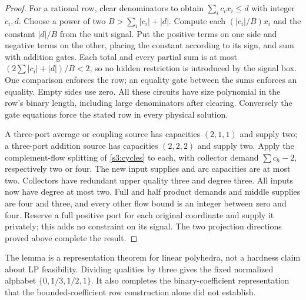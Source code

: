 \begin{proof}
For a rational row, clear denominators to obtain
$\sum_i c_ix_i\le d$ with integer $c_i,d$. Choose a power of two
$B>\sum_i|c_i|+|d|$. Compute each $(|c_i|/B)x_i$ and the constant
$|d|/B$ from the unit signal. Put the positive terms on one side and
negative terms on the other, placing the constant according to its sign,
and sum with addition gates. Each total and every partial sum is at
most $(2\sum|c_i|+|d|)/B<2$, so no hidden restriction is introduced
by the signal box. One comparison enforces the row; an equality gate
between the sums enforces an equality. Empty sides use zero. All these
circuits have size polynomial in the row's binary length, including
large denominators after clearing. Conversely the gate equations force
the stated row in every physical solution.

A three-port average or coupling source has capacities $(2,1,1)$ and
supply two; a three-port addition source has capacities $(2,2,2)$ and
supply two. Apply the complement-flow splitting of \cref{s3:cycles}
to each, with collector demand $\sum c_h-2$, respectively two or four.
The new input supplies and arc capacities are at most two. Collectors
have redundant upper quality three and degree three. All inputs now
have degree at most two. Full and half product demands and middle
supplies are four and three, and every other flow bound is an integer
between zero and four. Reserve a full positive port for each original
coordinate and supply it privately; this adds no constraint on its
signal. The two projection directions proved above complete the result.
\end{proof}

The lemma is a representation theorem for linear polyhedra, not a
hardness claim about LP feasibility. Dividing qualities by three gives
the fixed normalized alphabet $\{0,1/3,1/2,1\}$. It also completes the
binary-coefficient representation that the bounded-coefficient row
construction alone did not establish.

